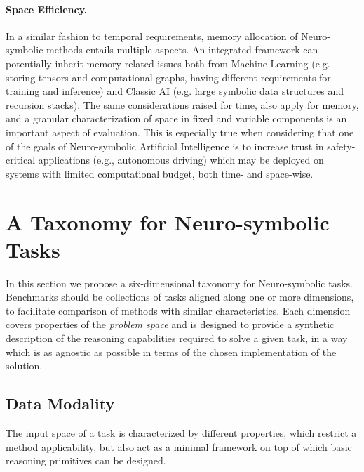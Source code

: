 \paragraph{Space Efficiency.} In a similar fashion to temporal requirements, memory allocation of Neuro-symbolic methods entails multiple aspects. An integrated framework can potentially inherit memory-related issues both from Machine Learning (e.g. storing tensors and computational graphs, having different requirements for training and inference) and Classic AI (e.g. large symbolic data structures and recursion stacks). The same considerations raised for time, also apply for memory, and a granular characterization of space in fixed and variable components is an important aspect of evaluation.
This is especially true when considering that one of the goals of Neuro-symbolic Artificial Intelligence is to increase trust in safety-critical applications (e.g., autonomous driving) which may be deployed on systems with limited computational budget, both time- and space-wise.

\section{A Taxonomy for Neuro-symbolic Tasks}\label{bench:sec:taxonomy}
In this section we propose a six-dimensional taxonomy for Neuro-symbolic tasks. %
Benchmarks should be collections of tasks aligned along one or more dimensions, to facilitate comparison of methods with similar characteristics.
Each dimension covers properties of the \textit{problem space} and is designed to provide a synthetic description of the reasoning capabilities required to solve a given task, in a way which is as agnostic as possible in terms of the chosen implementation of the solution.
%

\subsection{Data Modality}
The input space of a task is characterized by different properties, which restrict a method applicability, but also act as a minimal framework on top of which basic reasoning primitives can be designed.

